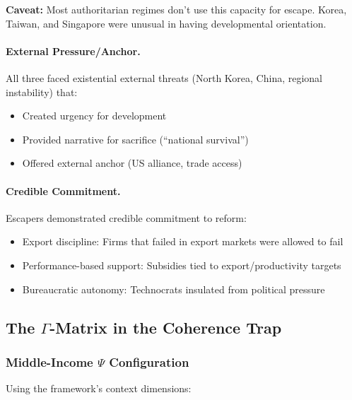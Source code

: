 \textbf{Caveat:} Most authoritarian regimes don't use this capacity for escape.
Korea, Taiwan, and Singapore were unusual in having developmental orientation.

\paragraph{External Pressure/Anchor.}
All three faced existential external threats (North Korea, China, regional 
instability) that:
\begin{itemize}
    \item Created urgency for development
    \item Provided narrative for sacrifice (``national survival'')
    \item Offered external anchor (US alliance, trade access)
\end{itemize}

\paragraph{Credible Commitment.}
Escapers demonstrated credible commitment to reform:
\begin{itemize}
    \item Export discipline: Firms that failed in export markets were allowed to fail
    \item Performance-based support: Subsidies tied to export/productivity targets
    \item Bureaucratic autonomy: Technocrats insulated from political pressure
\end{itemize}

\subsection{The $\Gamma$-Matrix in the Coherence Trap}

\subsubsection{Middle-Income $\Psi$ Configuration}

Using the framework's context dimensions:

